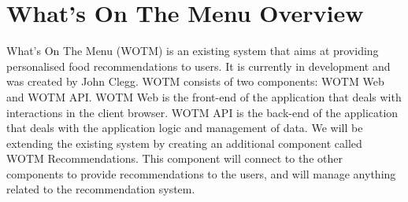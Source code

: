 
\section{What's On The Menu Overview}

What's On The Menu (WOTM) is an existing system that aims at providing personalised food recommendations to users. It is currently in development and was created by John Clegg. WOTM consists of two components: WOTM Web and WOTM API. WOTM Web is the front-end of the application that deals with interactions in the client browser. WOTM API is the back-end of the application that deals with the application logic and management of data. We will be extending the existing system by creating an additional component called WOTM Recommendations. This component will connect to the other components to provide recommendations to the users, and will manage anything related to the recommendation system. 







